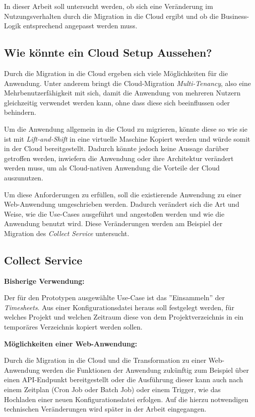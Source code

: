 In dieser Arbeit soll untersucht werden, ob sich eine Veränderung im Nutzungsverhalten durch die Migration in die Cloud ergibt und ob die Business-Logik entsprechend angepasst werden muss. \pagebreak

\subsection{Wie könnte ein Cloud Setup Aussehen?}
Durch die Migration in die Cloud ergeben sich viele Möglichkeiten für die Anwendung. Unter anderem bringt die Cloud-Migration \textit{\gls{Multi-Tenancy}}, also eine Mehrbenutzerfähigkeit mit sich, damit die Anwendung von mehreren Nutzern gleichzeitig verwendet werden kann, ohne dass diese sich beeinflussen oder behindern.

Um die Anwendung allgemein in die Cloud zu migrieren, könnte diese so wie sie ist mit \textit{Lift-and-Shift} in eine virtuelle Maschine Kopiert werden und würde somit in der Cloud bereitgestellt. Dadurch könnte jedoch keine Aussage darüber getroffen werden, inwiefern die Anwendung oder ihre Architektur verändert werden muss, um als Cloud-nativen Anwendung die Vorteile der Cloud auszunutzen.

Um diese Anforderungen zu erfüllen, soll die existierende Anwendung zu einer Web-Anwendung umgeschrieben werden. Dadurch verändert sich die Art und Weise, wie die Use-Cases ausgeführt und angestoßen werden und wie die Anwendung benutzt wird. Diese Veränderungen werden am Beispiel der Migration des \textit{Collect Service} untersucht.

\subsection{Collect Service}
\textbf{Bisherige Verwendung:}

Der für den Prototypen ausgewählte Use-Case ist das ''Einsammeln'' der \textit{\glspl{Timesheet}}. Aus einer Konfigurationsdatei heraus soll festgelegt werden, für welches Projekt und welchen Zeitraum diese von dem Projektverzeichnis in ein temporäres Verzeichnis kopiert werden sollen. 

\textbf{Möglichkeiten einer Web-Anwendung:}

Durch die Migration in die Cloud und die Transformation zu einer Web-Anwendung werden die Funktionen der Anwendung zukünftig zum Beispiel über einen API-Endpunkt bereitgestellt oder die Ausführung dieser kann auch nach einem Zeitplan (Cron Job oder Batch Job) oder einem Trigger, wie das Hochladen einer neuen Konfigurationsdatei erfolgen. Auf die hierzu notwendigen technischen Veränderungen wird später in der Arbeit eingegangen. \pagebreak

